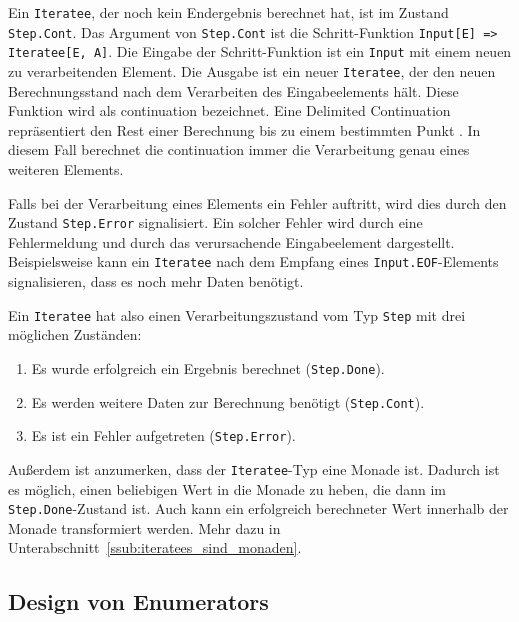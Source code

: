 Ein \lstinline|Iteratee|, der noch kein Endergebnis berechnet hat, ist im Zustand \lstinline|Step.Cont|.
Das Argument von \lstinline|Step.Cont| ist die Schritt-Funktion \lstinline[breaklines=true]|Input[E] => Iteratee[E, A]|.
Die Eingabe der Schritt-Funktion ist ein \lstinline|Input| mit einem neuen zu verarbeitenden Element.
Die Ausgabe ist ein neuer \lstinline|Iteratee|, der den neuen Berechnungsstand nach dem Verarbeiten des Eingabeelements hält.
Diese Funktion wird als \gls{continuation} bezeichnet.
Eine Delimited Continuation repräsentiert den Rest einer Berechnung bis zu einem bestimmten Punkt \cite[vgl.][S.~1]{continuations}.
In diesem Fall berechnet die \gls{continuation} immer die Verarbeitung genau eines weiteren Elements.

Falls bei der Verarbeitung eines Elements ein Fehler auftritt, wird dies durch den Zustand \lstinline|Step.Error| signalisiert.
Ein solcher Fehler wird durch eine Fehlermeldung und durch das verursachende Eingabeelement dargestellt.
Beispielsweise kann ein \lstinline|Iteratee| nach dem Empfang eines \lstinline|Input.EOF|-Elements signalisieren, dass es noch mehr Daten benötigt.

Ein \lstinline|Iteratee| hat also einen Verarbeitungszustand vom Typ \lstinline|Step| mit drei möglichen Zuständen:
\begin{enumerate}
  \item Es wurde erfolgreich ein Ergebnis berechnet (\lstinline|Step.Done|).
  \item Es werden weitere Daten zur Berechnung benötigt (\lstinline|Step.Cont|).
  \item Es ist ein Fehler aufgetreten (\lstinline|Step.Error|).
\end{enumerate}

Außerdem ist anzumerken, dass der \lstinline|Iteratee|-Typ eine Monade ist.
Dadurch ist es möglich, einen beliebigen Wert in die Monade zu heben, die dann im \lstinline|Step.Done|-Zustand ist.
Auch kann ein erfolgreich berechneter Wert innerhalb der Monade transformiert werden.
Mehr dazu in Unterabschnitt~\ref{ssub:iteratees_sind_monaden}.



\subsection{Design von Enumerators} %
\label{sub:design_enumerators}

